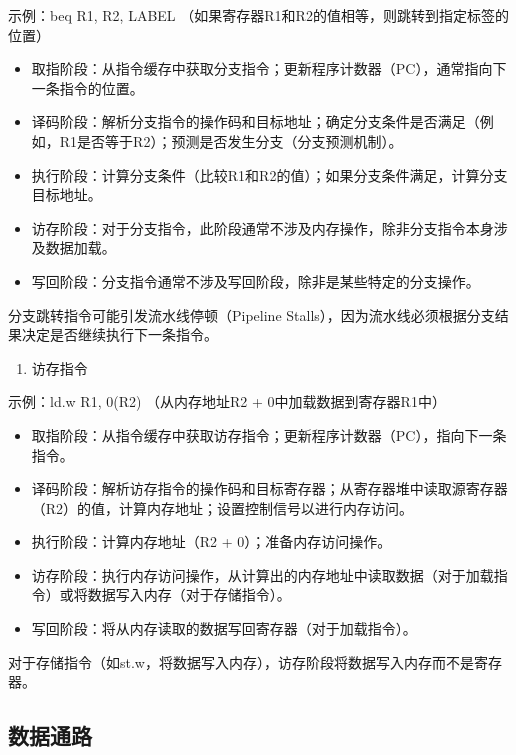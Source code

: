 示例：beq R1, R2, LABEL （如果寄存器R1和R2的值相等，则跳转到指定标签的位置）

\begin{itemize}
\item
  取指阶段：从指令缓存中获取分支指令；更新程序计数器（PC），通常指向下一条指令的位置。
\item
  译码阶段：解析分支指令的操作码和目标地址；确定分支条件是否满足（例如，R1是否等于R2）；预测是否发生分支（分支预测机制）。
\item
  执行阶段：计算分支条件（比较R1和R2的值）；如果分支条件满足，计算分支目标地址。
\item
  访存阶段：对于分支指令，此阶段通常不涉及内存操作，除非分支指令本身涉及数据加载。
\item
  写回阶段：分支指令通常不涉及写回阶段，除非是某些特定的分支操作。
\end{itemize}

分支跳转指令可能引发流水线停顿（Pipeline Stalls），因为流水线必须根据分支结果决定是否继续执行下一条指令。

\begin{enumerate}
\def\labelenumi{\arabic{enumi}.}
\setcounter{enumi}{2}
\tightlist
\item
  访存指令
\end{enumerate}

示例：ld.w R1, 0(R2) （从内存地址R2 + 0中加载数据到寄存器R1中）

\begin{itemize}
\item
  取指阶段：从指令缓存中获取访存指令；更新程序计数器（PC），指向下一条指令。
\item
  译码阶段：解析访存指令的操作码和目标寄存器；从寄存器堆中读取源寄存器（R2）的值，计算内存地址；设置控制信号以进行内存访问。
\item
  执行阶段：计算内存地址（R2 + 0）；准备内存访问操作。
\item
  访存阶段：执行内存访问操作，从计算出的内存地址中读取数据（对于加载指令）或将数据写入内存（对于存储指令）。
\item
  写回阶段：将从内存读取的数据写回寄存器（对于加载指令）。
\end{itemize}

对于存储指令（如st.w，将数据写入内存），访存阶段将数据写入内存而不是寄存器。

\subsection{数据通路}\label{sec:05-simple-cpu-010}

